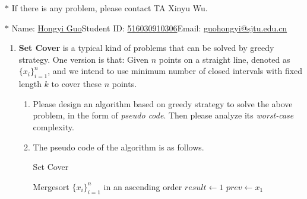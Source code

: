 \documentclass[12pt,a4paper]{article}
\makeatletter
\newtheorem*{solution}{Solution}
\theoremstyle{definition}
\renewenvironment{solution}[1][Solution] {\par\pushQED{\qed}\normalfont\topsep6\p@\@plus6\p@\relax\trivlist\item[\hskip\labelsep\bfseries#1\@addpunct{.}]\ignorespaces}{\popQED\endtrivlist\@endpefalse} \makeatother
\makeatother
\begin{document}
\noindent

\noindent{}
\begin{center}
\footnotesize{\color{red}$*$ If there is any problem, please contact TA Xinyu Wu. }

\footnotesize{\color{blue}$*$ Name: \underline{Hongyi Guo}\quad Student ID: \underline{516030910306}\quad Email: \underline{guohongyi@sjtu.edu.cn}}
\end{center}

\begin{enumerate}
\item \textbf{Set Cover} is a typical kind of problems that can be solved by greedy strategy. One version is that: Given $n$ points on a straight line, denoted as $\{x_i\}_{i=1}^n$, and we intend to use minimum number of closed intervals with fixed length $k$ to cover these $n$ points.
    \begin{enumerate}
        \item Please design an algorithm based on greedy strategy to solve the above problem, in the form of \emph{pseudo code}. Then please analyze its \emph{worst-case} complexity.
            \begin{solution} The pseudo code of the algorithm is as follows.\par
            \begin{minipage}[t]{0.9\textwidth}
            \begin{algorithm}[H]
            	\BlankLine
            	\caption{Set Cover}\label{Alg_SetCover}
            	\BlankLine
            	Mergesort $\{x_i\}_{i=1}^n$ in an ascending order\;
                $result\leftarrow 1$\;
            	$prev\leftarrow x_1$\;
\end{algorithm}
\end{minipage}
\end{solution}
\end{enumerate}
\end{enumerate}
\end{document}
